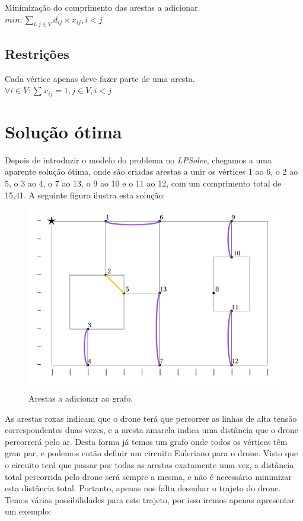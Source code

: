 \documentclass{article}
\begin{document}
Minimização do comprimento das arestas a adicionar.\\
\(min: \sum_{i,j \in V} d_{ij} \times x_{ij}, i < j\)

\subsection{Restrições}

Cada vértice apenas deve fazer parte de uma aresta.\\
\(\forall i \in V: \sum x_{ij} = 1, j \in V, i < j\)

\section{Solução ótima}

Depois de introduzir o modelo do problema no \emph{LPSolve}, chegamos a uma aparente solução ótima, onde são criadas arestas a unir os vértices 1 ao 6, o 2 ao 5, o 3 ao 4, o 7 ao 13, o 9 ao 10 e o 11 ao 12, com um comprimento total de 15,41. A seguinte figura ilustra esta solução: 

\begin{figure}[H]
    \centering
    \includegraphics[width=0.8\linewidth]{fig4.png}
    \caption{Arestas a adicionar ao grafo.}
    \label{arestas}
\end{figure}

As arestas roxas indicam que o drone terá que percorrer as linhas de alta tensão correspondentes duas vezes, e a aresta amarela indica uma distância que o drone percorrerá pelo ar. Desta forma já temos um grafo onde todos os vértices têm grau par, e podemos então definir um circuito Euleriano para o drone. Visto que o circuito terá que passar por todas as arestas exatamente uma vez, a distância total percorrida pelo drone será sempre a mesma, e não é necessário minimizar esta distância total. Portanto, apenas nos falta desenhar o trajeto do drone. Temos várias possibilidades para este trajeto, por isso iremos apenas apresentar um exemplo:
\end{document}
